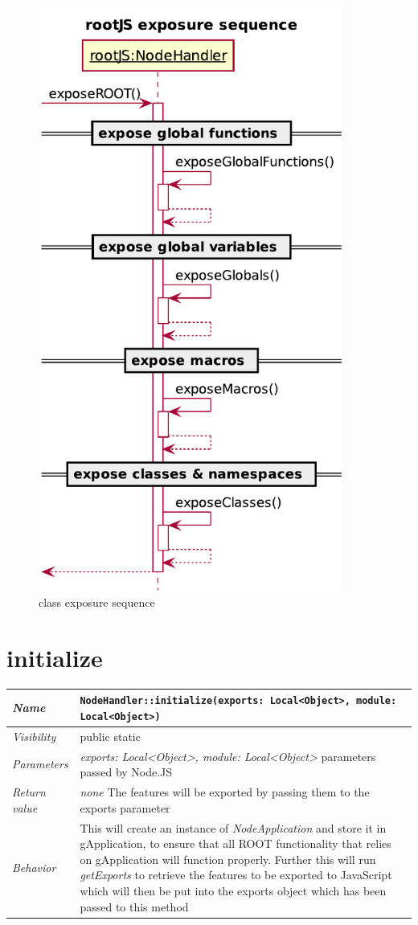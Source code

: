 \begin{figure}[H]
	\centering
	\includegraphics[width=10cm]{./latex/resources/exposureSequence.pdf}
	\caption{class exposure sequence}
\end{figure} \pagebreak
\section{initialize}
\begin{longtable}{p{3cm} @{\hskip 1cm} p{12cm}}
 \hline
\textit{Name} & \texttt{NodeHandler::initialize(exports: Local<Object>, module: Local<Object>)}\\
\hline
 \textit{Visibility} & public static\\
\hline
\textit{Parameters} & \textit{exports: Local<Object>, module: Local<Object>} parameters passed by Node.JS\\
\hline
\textit{Return value} & \textit{none} The features will be exported by passing them to the exports parameter \\
  \hline
 \textit{Behavior} & This will create an instance of \textit{NodeApplication} and store it in gApplication, to ensure that all ROOT functionality that relies on gApplication will function properly.
 Further this will run \textit{getExports} to retrieve the features to be exported to JavaScript which will then be put into the exports object which has been passed to this method \\
\hline
\end{longtable}
